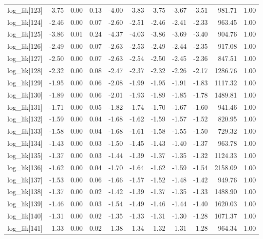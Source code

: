 \begin{table}[ht]
\begin{tabular}{rrrrrrrrrrr}
  log\_lik[123] & -3.75 & 0.00 & 0.13 & -4.00 & -3.83 & -3.75 & -3.67 & -3.51 & 981.71 & 1.00 \\ 
  log\_lik[124] & -2.46 & 0.00 & 0.07 & -2.60 & -2.51 & -2.46 & -2.41 & -2.33 & 963.45 & 1.00 \\ 
  log\_lik[125] & -3.86 & 0.01 & 0.24 & -4.37 & -4.03 & -3.86 & -3.69 & -3.40 & 904.76 & 1.00 \\ 
  log\_lik[126] & -2.49 & 0.00 & 0.07 & -2.63 & -2.53 & -2.49 & -2.44 & -2.35 & 917.08 & 1.00 \\ 
  log\_lik[127] & -2.50 & 0.00 & 0.07 & -2.63 & -2.54 & -2.50 & -2.45 & -2.36 & 847.51 & 1.00 \\ 
  log\_lik[128] & -2.32 & 0.00 & 0.08 & -2.47 & -2.37 & -2.32 & -2.26 & -2.17 & 1286.76 & 1.00 \\ 
  log\_lik[129] & -1.95 & 0.00 & 0.06 & -2.08 & -1.99 & -1.95 & -1.91 & -1.83 & 1117.32 & 1.00 \\ 
  log\_lik[130] & -1.89 & 0.00 & 0.06 & -2.01 & -1.93 & -1.89 & -1.85 & -1.78 & 1489.81 & 1.00 \\ 
  log\_lik[131] & -1.71 & 0.00 & 0.05 & -1.82 & -1.74 & -1.70 & -1.67 & -1.60 & 941.46 & 1.00 \\ 
  log\_lik[132] & -1.59 & 0.00 & 0.04 & -1.68 & -1.62 & -1.59 & -1.57 & -1.52 & 820.95 & 1.00 \\ 
  log\_lik[133] & -1.58 & 0.00 & 0.04 & -1.68 & -1.61 & -1.58 & -1.55 & -1.50 & 729.32 & 1.00 \\ 
  log\_lik[134] & -1.43 & 0.00 & 0.03 & -1.50 & -1.45 & -1.43 & -1.40 & -1.37 & 963.78 & 1.00 \\ 
  log\_lik[135] & -1.37 & 0.00 & 0.03 & -1.44 & -1.39 & -1.37 & -1.35 & -1.32 & 1124.33 & 1.00 \\ 
  log\_lik[136] & -1.62 & 0.00 & 0.04 & -1.70 & -1.64 & -1.62 & -1.59 & -1.54 & 2158.09 & 1.00 \\ 
  log\_lik[137] & -1.53 & 0.00 & 0.06 & -1.66 & -1.57 & -1.52 & -1.48 & -1.42 & 949.76 & 1.00 \\ 
  log\_lik[138] & -1.37 & 0.00 & 0.02 & -1.42 & -1.39 & -1.37 & -1.35 & -1.33 & 1488.90 & 1.00 \\ 
  log\_lik[139] & -1.46 & 0.00 & 0.03 & -1.54 & -1.49 & -1.46 & -1.44 & -1.40 & 1620.03 & 1.00 \\ 
  log\_lik[140] & -1.31 & 0.00 & 0.02 & -1.35 & -1.33 & -1.31 & -1.30 & -1.28 & 1071.37 & 1.00 \\ 
  log\_lik[141] & -1.33 & 0.00 & 0.02 & -1.38 & -1.34 & -1.32 & -1.31 & -1.28 & 964.34 & 1.00 \\ 

\end{tabular}
\end{table}
